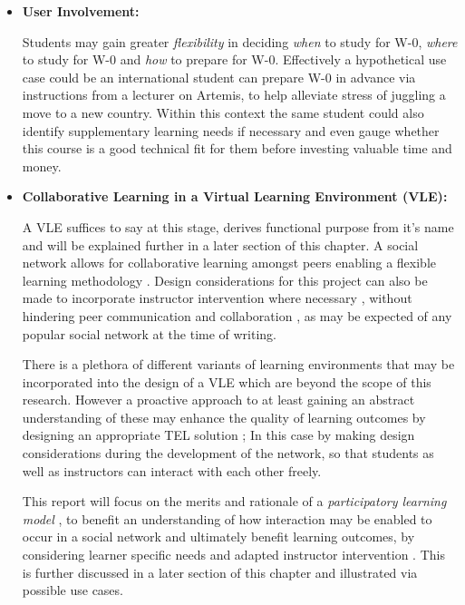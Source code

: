 \begin{itemize}
    \item \textbf{User Involvement:}
    
    Students may gain greater \textit{flexibility} in deciding \textit{when} to study for W-0, \textit{where} to study for W-0 and \textit{how} to prepare for W-0. Effectively a hypothetical use case could be an international student can prepare W-0 in advance via instructions from a lecturer on Artemis, to help alleviate stress of juggling a move to a new country. Within this context the same student could also identify supplementary learning needs if necessary and even gauge whether this course is a good technical fit for them before investing valuable time and money.
       
    \item \textbf{Collaborative Learning in a Virtual Learning Environment (VLE):}
    
    A VLE suffices to say at this stage, derives functional purpose from it's name and will be explained further in a later section of this chapter. A social network allows for collaborative learning amongst peers enabling a flexible learning methodology \cite{Cubukcuo2012}. Design considerations for this project can also be made to incorporate instructor intervention where necessary \cite{Cubukcuo2012,Burge2011}, without hindering peer  communication and collaboration \cite{Cubukcuo2012}, as may be expected of any popular social network at the time of writing.
    
    There is a plethora of different variants of learning environments that may be incorporated into the design of a VLE \cite{Richmond2005,Cubukcuo2012,Burge2011} which are beyond the scope of this research. However a proactive approach to at least gaining an abstract understanding of these may enhance the quality of learning outcomes by designing an appropriate TEL solution \cite{Cubukcuo2012}; In this case by making design considerations during the development of the network, so that students as well as instructors can interact with each other freely.
    
    This report will focus on the merits and rationale of a \textit{participatory learning model} \cite{Yager1990,Yager2004}, to benefit an understanding of how interaction may be enabled to occur in a social network and ultimately benefit learning outcomes, by considering learner specific needs and adapted instructor intervention \cite{Cubukcuo2012}. This is further discussed in a later section of this chapter and illustrated via possible use cases.
    
\end{itemize}

